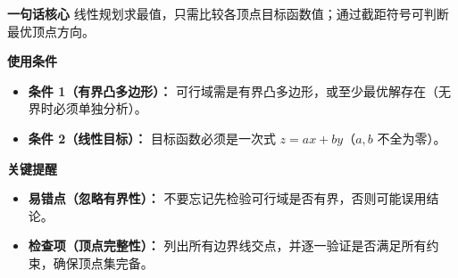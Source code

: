 \begin{summarybox}
	\textbf{\textcolor{CSummary}{一句话核心}}
	线性规划求最值，只需比较各顶点目标函数值；通过截距符号可判断最优顶点方向。

	\medskip
	\textbf{\textcolor{CSummary}{使用条件}}
	\begin{itemize}[leftmargin=*, itemsep=0.5em, topsep=0.4em]
		\item \textbf{条件 1（有界凸多边形）：} 可行域需是有界凸多边形，或至少最优解存在（无界时必须单独分析）。
		\item \textbf{条件 2（线性目标）：} 目标函数必须是一次式 $z=ax+by$（$a,b$ 不全为零）。
	\end{itemize}

	\medskip
	\textbf{\textcolor{CSummary}{关键提醒}}
	\begin{itemize}[leftmargin=*, itemsep=0.5em, topsep=0.4em]
		\item \textbf{易错点（忽略有界性）：} 不要忘记先检验可行域是否有界，否则可能误用结论。
		\item \textbf{检查项（顶点完整性）：} 列出所有边界线交点，并逐一验证是否满足所有约束，确保顶点集完备。
	\end{itemize}

\end{summarybox}
